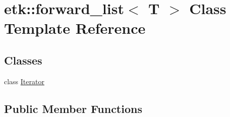 \hypertarget{classetk_1_1forward__list}{\section{etk\-:\-:forward\-\_\-list$<$ T $>$ Class Template Reference}
\label{classetk_1_1forward__list}
}
\subsection*{Classes}
\begin{DoxyCompactItemize}
\item 
class \hyperlink{classetk_1_1forward__list_1_1_iterator}{Iterator}
\end{DoxyCompactItemize}
\subsection*{Public Member Functions}
